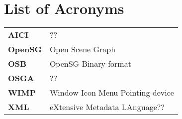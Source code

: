 \chapter*{List of Acronyms}


\begin{tabular}{ll}

\textbf{AICI} & ?? \\

\textbf{OpenSG} & Open Scene Graph \\

\textbf{OSB} & OpenSG Binary format \\

\textbf{OSGA} & ?? \\

\textbf{WIMP} & Window Icon Menu Pointing device \\

\textbf{XML} & eXtensive Metadata LAnguage?? \\

\end{tabular}
